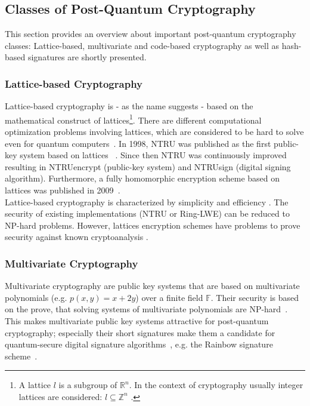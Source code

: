\subsection{Classes of Post-Quantum Cryptography} \label{classes_pqc}

This section provides an overview about important post-quantum cryptography classes: Lattice-based, multivariate and code-based cryptography as well as hash-based signatures are shortly presented. 

\subsubsection{Lattice-based Cryptography}
Lattice-based cryptography is - as the name suggests - based on the mathematical construct of lattices\footnote{A lattice $l$ is a subgroup of $\mathbb{R}^n$. In the context of cryptography usually integer lattices are considered: $l \subseteq \mathbb{Z}^n$ \parencite{chi2015lattice}.}. There are different computational optimization problems involving lattices, which are considered to be hard to solve even for quantum computers~\parencite{chi2015lattice}. In 1998, NTRU was published as the first public-key system based on lattices ~\parencite{hoffstein1998ntru}. Since then NTRU was continuously improved resulting in NTRUencrypt (public-key system) and NTRUsign (digital signing algorithm). Furthermore, a fully homomorphic encryption scheme based on lattices was published in 2009~\parencite{gentry2009fully}.\\
Lattice-based cryptography is characterized by simplicity and efficiency \parencite{chen2016report}. The security of existing implementations (NTRU or Ring-LWE) can be reduced to NP-hard problems. However, lattices encryption schemes have problems to prove security against known cryptoanalysis \parencite{chen2016report}.
\subsubsection{Multivariate Cryptography}
Multivariate cryptography are public key systems that are based on multivariate polynomials (e.g. $p(x,y)=x+2y$) over a finite field $\mathbb{F}$. Their security is based on the prove, that solving systems of multivariate polynomials are NP-hard~\parencite{hartmanis1982computers}. This makes multivariate public key systems attractive for post-quantum cryptography; especially their short signatures make them a candidate for quantum-secure digital signature algorithms~\parencite{ding2017current}, e.g. the Rainbow signature scheme~\parencite{ding2005rainbow}.
